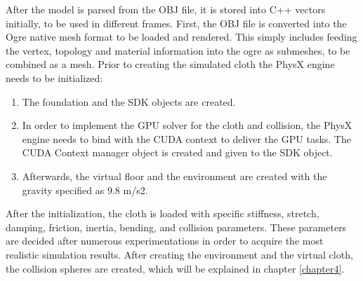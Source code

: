 After the model is parsed from the OBJ file, it is stored into C++ vectors initially, to be used in different frames. First, the OBJ file is converted into the Ogre native mesh format to be loaded and rendered. This simply includes feeding the vertex, topology and material information into the ogre as submeshes, to be combined as a mesh.
Prior to creating the simulated cloth the PhysX engine needs to be initialized:

\begin{enumerate}
\item The foundation and the SDK objects are created.
\item In order to implement the GPU solver for the cloth and collision, the PhysX engine needs to bind with the CUDA context to deliver the GPU tasks. The CUDA Context manager object is created and given to the SDK object.
\item Afterwards, the virtual floor and the environment are created with the gravity specified as 9.8 m/s2. 
\end{enumerate}

After the initialization, the cloth is loaded with specific stiffness, stretch, damping, friction, inertia, bending, and collision parameters. These parameters are decided after numerous experimentations in order to acquire the most realistic simulation results.
After creating the environment and the virtual cloth, the collision spheres are created, which will be explained in chapter \ref{chapter4}.

